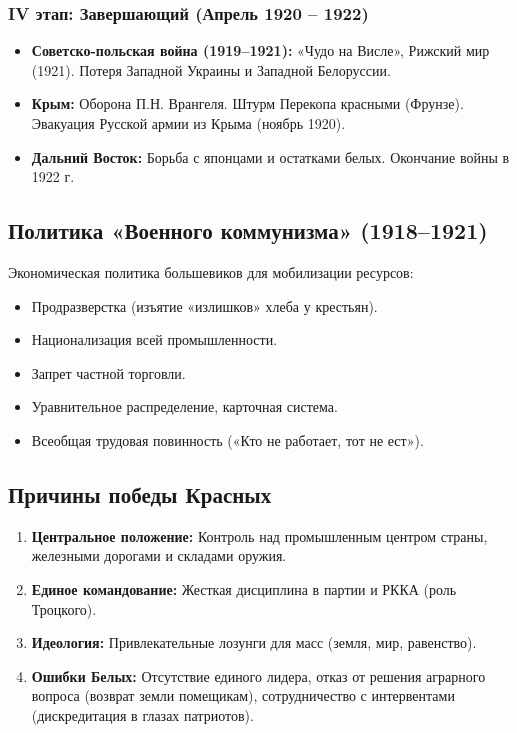 \documentclass[12pt]{article}
\begin{document}
	\subsubsection{IV этап: Завершающий (Апрель 1920 -- 1922)}
	\begin{itemize}
		\item \textbf{Советско-польская война (1919--1921):} «Чудо на Висле», Рижский мир (1921). Потеря Западной Украины и Западной Белоруссии.
		\item \textbf{Крым:} Оборона П.Н. Врангеля. Штурм Перекопа красными (Фрунзе). Эвакуация Русской армии из Крыма (ноябрь 1920).
		\item \textbf{Дальний Восток:} Борьба с японцами и остатками белых. Окончание войны в 1922 г.
	\end{itemize}
	
	\subsection{Политика «Военного коммунизма» (1918--1921)}
	Экономическая политика большевиков для мобилизации ресурсов:
	\begin{itemize}
		\item Продразверстка (изъятие «излишков» хлеба у крестьян).
		\item Национализация всей промышленности.
		\item Запрет частной торговли.
		\item Уравнительное распределение, карточная система.
		\item Всеобщая трудовая повинность («Кто не работает, тот не ест»).
	\end{itemize}
	
	\subsection{Причины победы Красных}
	\begin{enumerate}
		\item \textbf{Центральное положение:} Контроль над промышленным центром страны, железными дорогами и складами оружия.
		\item \textbf{Единое командование:} Жесткая дисциплина в партии и РККА (роль Троцкого).
		\item \textbf{Идеология:} Привлекательные лозунги для масс (земля, мир, равенство).
		\item \textbf{Ошибки Белых:} Отсутствие единого лидера, отказ от решения аграрного вопроса (возврат земли помещикам), сотрудничество с интервентами (дискредитация в глазах патриотов).
	\end{enumerate}
	
\end{document}
